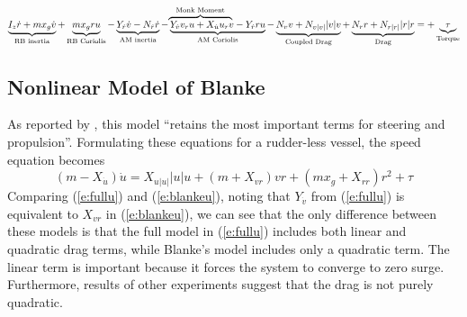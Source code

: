 \documentclass[11pt,draftcls,journal,onecolumn]{IEEEtran}
\begin{document}
\begin{equation}
\underbrace{I_z \dot{r} + m x_g \dot{v}}_\text{RB inertia}  
+ \underbrace{m x_g ru}_\text{RB Coriolis}
- \underbrace{Y_{\dot{r}}\dot{v} - N_{\dot{r}}\dot{r}}_\text{AM inertia}
- \lefteqn{\overbrace{\phantom{Y_{\dot{v}}v_r u + X_{\dot{u}}u_r v}}^\text{Monk Moment}}
\underbrace{Y_{\dot{v}}v_r u + X_{\dot{u}}u_r v - Y_{\dot{r}}ru}_\text{AM Coriolis}
- \underbrace{N_v v + N_{v|v|}|v|v}_\text{Coupled Drag} 
+ \underbrace{N_r r + N_{r|r|}|r|r}_\text{Drag} 
= 
+ \underbrace{\tau}_\text{Torque}
\label{e:fullr}
\end{equation}

\subsection{Nonlinear Model of Blanke}
As reported by \cite{fossen94guidance}, this model ``retains the most important terms for steering and propulsion''.  Formulating these equations for a rudder-less vessel, the speed equation becomes
\begin{equation}
(m-X_{\dot{u}}) \dot{u} = X_{u|u|}|u|u + (m+X_{vr})vr + (mx_g+X_{rr})r^2 + \tau
\label{e:blankeu}
\end{equation}
Comparing (\ref{e:fullu}) and (\ref{e:blankeu}), noting that $Y_{\dot{v}}$ from  (\ref{e:fullu}) is equivalent to $X_{vr}$ in (\ref{e:blankeu}),  we can see that the only difference between these models is that the full model in (\ref{e:fullu}) includes both linear and quadratic drag terms, while Blanke's model includes only a quadratic term.  The linear term is important because it forces the system to converge to zero surge.  Furthermore, results of other experiments suggest that the drag is not purely quadratic.  
\end{document}
